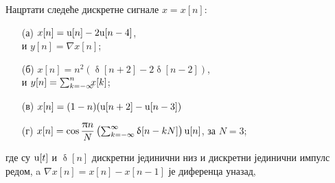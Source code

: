 \newpage
\noindent
\PID
Нацртати следеће
дискретне сигнале $x=x[n]$:
\begin{multicols}{2}
\begin{enumerate}
\item[(а)] $x[n] = {\rm u}[n] - 2{\rm u}[n-4]$, \\ и 
$y[n] = \nabla x[n]$;
\item[(б)] $x[n] = n^2( \updelta[n+2] - 2\updelta[n-2] )$, \\ и 
$y[n] = \sum_{k = -\infty}^n \hspace*{-0.5em}
 x[k]$;
\item[(в)] $x[n] = (1-n)({\rm u}[n+2] - {\rm u}[n-3])$
\item[(г)]  $x[n] = \cos\dfrac{\uppi n}{N}  
\left(
\sum_{k = -\infty}^{\infty} \updelta[n-kN]
\right)  {\rm u}[n] $, за $N = 3$;
\end{enumerate}
\end{multicols}
\noindent
где су ${\rm u}[t]$ и $\updelta[n]$ дискретни 
јединични низ
и дискретни јединични импулс редом, a $\nabla x[n] = x[n] - x[n-1]$ је диференца уназад,
\vspace*{5mm}

